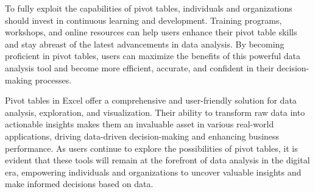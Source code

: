 \documentclass[
]{book}
\begin{document}
To fully exploit the capabilities of pivot tables, individuals and organizations should invest in continuous learning and development. Training programs, workshops, and online resources can help users enhance their pivot table skills and stay abreast of the latest advancements in data analysis. By becoming proficient in pivot tables, users can maximize the benefits of this powerful data analysis tool and become more efficient, accurate, and confident in their decision-making processes.

Pivot tables in Excel offer a comprehensive and user-friendly solution for data analysis, exploration, and visualization. Their ability to transform raw data into actionable insights makes them an invaluable asset in various real-world applications, driving data-driven decision-making and enhancing business performance. As users continue to explore the possibilities of pivot tables, it is evident that these tools will remain at the forefront of data analysis in the digital era, empowering individuals and organizations to uncover valuable insights and make informed decisions based on data.

  
\end{document}
